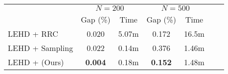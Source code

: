 \begin{tabular}{lcccccc}
    \toprule
     & \multicolumn{2}{c}{$N=200$} & \multicolumn{2}{c}{$N=500$}  \\
     \cmidrule(r){2-3} \cmidrule(r){4-5} 
     & Gap (\%) & Time & Gap (\%) & Time \\
    \midrule
    LEHD + RRC & 0.020 & 5.07m & 0.172 & 16.5m  \\
    LEHD + Sampling & 0.022 & 0.14m & 0.376 & 1.46m \\
    LEHD + \ours{} (Ours) & \textbf{0.004} & 0.18m & \textbf{0.152} & 1.48m \\ 

    \bottomrule
\end{tabular}